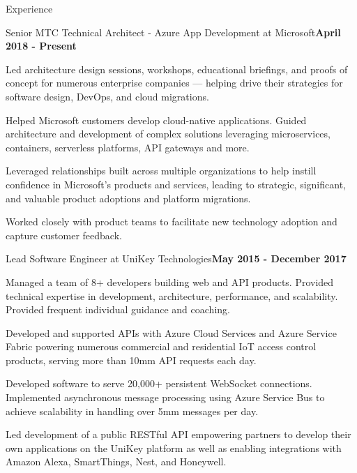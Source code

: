 \documentclass{resume} %
\begin{document}
\begin{rSection}{Experience}


\begin{rSubsection}{Senior MTC Technical Architect - Azure App Development at Microsoft}{\bf April 2018 - Present}{}{}

\item Led architecture design sessions, workshops, educational briefings, and proofs of concept for numerous enterprise companies --- helping drive their strategies for software design, DevOps, and cloud migrations.
\item Helped Microsoft customers develop cloud-native applications.  Guided architecture and development of complex solutions leveraging microservices, containers, serverless platforms, API gateways and more.
\item Leveraged relationships built across multiple organizations to help instill confidence in Microsoft's products and services, leading to strategic, significant, and valuable product adoptions and platform migrations.
\item Worked closely with product teams to facilitate new technology adoption and capture customer feedback.

\end{rSubsection}


\begin{rSubsection}{Lead Software Engineer at UniKey Technologies}{\bf May 2015 - December 2017}{}{}

\item Managed a team of 8+ developers building web and API products.  Provided technical expertise in development, architecture, performance, and scalability.  Provided frequent individual guidance and coaching.
\item Developed and supported APIs with Azure Cloud Services and Azure Service Fabric powering numerous commercial and residential IoT access control products, serving more than 10mm API requests each day.
\item Developed software to serve 20,000+ persistent WebSocket connections. Implemented asynchronous message processing using Azure Service Bus to achieve scalability in handling over 5mm messages per day.
\item Led development of a public RESTful API empowering partners to develop their own applications on the UniKey platform as well as enabling integrations with Amazon Alexa, SmartThings, Nest, and Honeywell.
\end{rSubsection}


\end{rSection}
\end{document}
